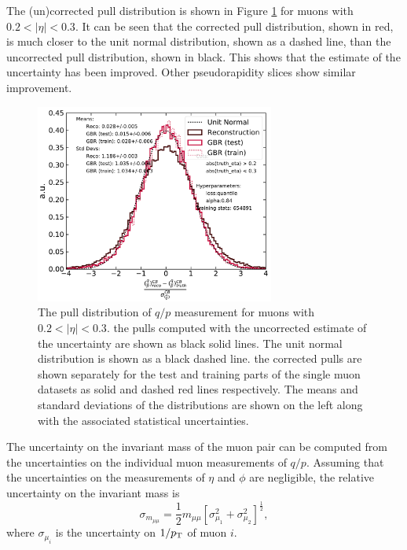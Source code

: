 The (un)corrected pull distribution is shown in Figure \ref{fig:muon:std-single}
for muons with $0.2 < |\eta| < 0.3$.
It can be seen that the corrected pull distribution, shown in red, is much closer
to the unit normal distribution, shown as a dashed line, than the uncorrected
pull distribution, shown in black. This shows that the estimate of the
uncertainty has been improved. Other pseudorapidity slices show similar improvement.
\begin{figure}[h!]
  \centering
  \includegraphics[width=0.7\textwidth]{figures/muons/vader-std-single}
  \caption[VADER4$\mu$ uncertainty correction on the single muon dataset]
  {The pull distribution of $q/p$ measurement for muons with $0.2 < |\eta| < 0.3$.
  the pulls computed with the uncorrected estimate of the uncertainty are shown
  as black solid lines. The unit normal distribution is shown as a black dashed
  line. the corrected pulls are shown separately for the test and training parts
  of the single muon datasets as solid and dashed red lines respectively.
  The means and standard deviations of the distributions are shown on the left
  along with the associated statistical uncertainties.
  }
  \label{fig:muon:std-single}
\end{figure}

The uncertainty on the invariant mass of the muon pair can be computed from the 
uncertainties on the individual muon measurements of $q/p$. Assuming that the
uncertainties on the measurements of $\eta$ and $\phi$ are negligible, the
relative uncertainty on the invariant mass is
\begin{equation}
\sigma_{m_{\mu\mu}} = \frac{1}{2}m_{\mu\mu}
\left[ \sigma^2_{\mu_1} + \sigma^2_{\mu_2}\right]^\frac{1}{2},
\end{equation}
where $\sigma_{\mu_i}$ is the uncertainty on $1/p_{\text{T}}$ of muon $i$.

